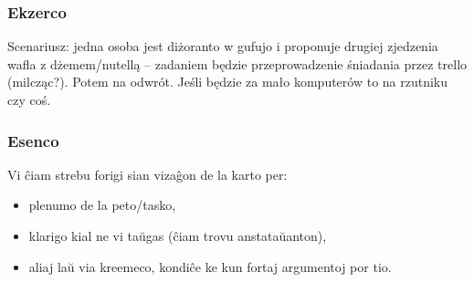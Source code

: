   \begin{frame}
    \frametitle{Ekzerco}
	
	Scenariusz: jedna osoba jest diżoranto w gufujo i proponuje drugiej zjedzenia wafla z dżemem/nutellą -- zadaniem będzie przeprowadzenie śniadania przez trello (milcząc?). Potem na odwrót. Jeśli będzie za mało komputerów to na rzutniku czy coś.
    
    
  \end{frame}


  \begin{frame}
    \frametitle{Esenco}
    
	Vi ĉiam strebu \alert{forigi sian vizaĝon de la karto} per:
    
    \begin{itemize}
    	\item plenumo de la peto/tasko,
    	\item klarigo kial ne vi taŭgas (ĉiam trovu anstataŭanton),
    	\item aliaj laŭ via kreemeco, kondiĉe ke kun \alert{fortaj argumentoj} por tio.
    \end{itemize}
    
  \end{frame}

